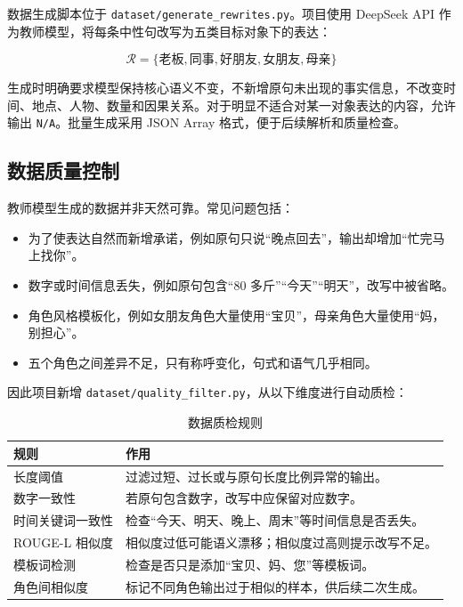 \documentclass[12pt,a4paper]{ctexart}
\begin{document}
数据生成脚本位于 \texttt{dataset/generate\_rewrites.py}。项目使用 DeepSeek API 作为教师模型，将每条中性句改写为五类目标对象下的表达：

\[
\mathcal{R}=\{\text{老板},\text{同事},\text{好朋友},\text{女朋友},\text{母亲}\}
\]

生成时明确要求模型保持核心语义不变，不新增原句未出现的事实信息，不改变时间、地点、人物、数量和因果关系。对于明显不适合对某一对象表达的内容，允许输出 \texttt{N/A}。批量生成采用 JSON Array 格式，便于后续解析和质量检查。

\subsection{数据质量控制}

教师模型生成的数据并非天然可靠。常见问题包括：

\begin{itemize}[leftmargin=2em]
  \item 为了使表达自然而新增承诺，例如原句只说“晚点回去”，输出却增加“忙完马上找你”。
  \item 数字或时间信息丢失，例如原句包含“80 多斤”“今天”“明天”，改写中被省略。
  \item 角色风格模板化，例如女朋友角色大量使用“宝贝”，母亲角色大量使用“妈，别担心”。
  \item 五个角色之间差异不足，只有称呼变化，句式和语气几乎相同。
\end{itemize}

因此项目新增 \texttt{dataset/quality\_filter.py}，从以下维度进行自动质检：

\begin{table}[H]
\centering
\caption{数据质检规则}
\begin{tabular}{p{4cm}|p{8.5cm}}
\toprule
规则 & 作用 \\
\midrule
长度阈值 & 过滤过短、过长或与原句长度比例异常的输出。 \\
数字一致性 & 若原句包含数字，改写中应保留对应数字。 \\
时间关键词一致性 & 检查“今天、明天、晚上、周末”等时间信息是否丢失。 \\
ROUGE-L 相似度 & 相似度过低可能语义漂移；相似度过高则提示改写不足。 \\
模板词检测 & 检查是否只是添加“宝贝、妈、您”等模板词。 \\
角色间相似度 & 标记不同角色输出过于相似的样本，供后续二次生成。 \\
\bottomrule
\end{tabular}
\end{table}
\end{document}
